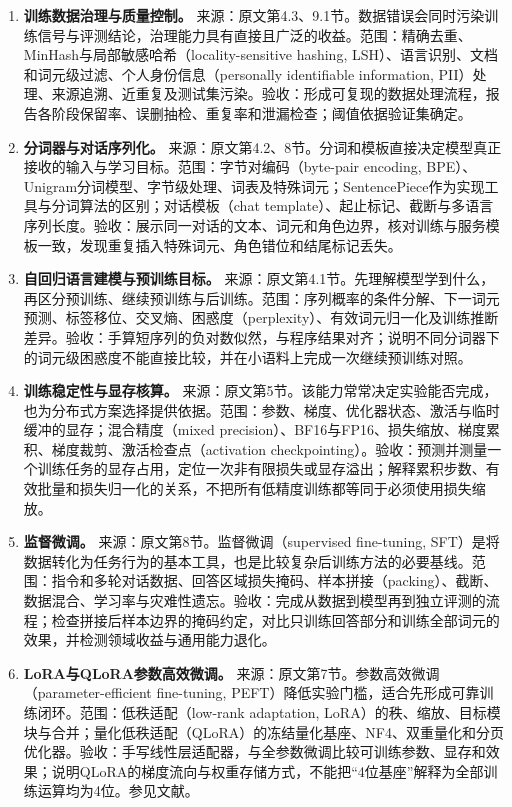 \documentclass[UTF8,12pt,a4paper,fontset=fandol]{ctexart}
\begin{document}
\begin{enumerate}[label=\arabic*.,series=techrank]
\item \textbf{训练数据治理与质量控制。}\label{tech:data}
来源：原文第4.3、9.1节。数据错误会同时污染训练信号与评测结论，治理能力具有直接且广泛的收益。范围：精确去重、MinHash与局部敏感哈希（locality-sensitive hashing, LSH）、语言识别、文档和词元级过滤、个人身份信息（personally identifiable information, PII）处理、来源追溯、近重复及测试集污染。验收：形成可复现的数据处理流程，报告各阶段保留率、误删抽检、重复率和泄漏检查；阈值依据验证集确定。

\item \textbf{分词器与对话序列化。}\label{tech:tokenizer}
来源：原文第4.2、8节。分词和模板直接决定模型真正接收的输入与学习目标。范围：字节对编码（byte-pair encoding, BPE）、Unigram分词模型、字节级处理、词表及特殊词元；SentencePiece作为实现工具与分词算法的区别；对话模板（chat template）、起止标记、截断与多语言序列长度。验收：展示同一对话的文本、词元和角色边界，核对训练与服务模板一致，发现重复插入特殊词元、角色错位和结尾标记丢失。

\item \textbf{自回归语言建模与预训练目标。}\label{tech:pretraining}
来源：原文第4.1节。先理解模型学到什么，再区分预训练、继续预训练与后训练。范围：序列概率的条件分解、下一词元预测、标签移位、交叉熵、困惑度（perplexity）、有效词元归一化及训练推断差异。验收：手算短序列的负对数似然，与程序结果对齐；说明不同分词器下的词元级困惑度不能直接比较，并在小语料上完成一次继续预训练对照。

\item \textbf{训练稳定性与显存核算。}\label{tech:stability}
来源：原文第5节。该能力常常决定实验能否完成，也为分布式方案选择提供依据。范围：参数、梯度、优化器状态、激活与临时缓冲的显存；混合精度（mixed precision）、BF16与FP16、损失缩放、梯度累积、梯度裁剪、激活检查点（activation checkpointing）。验收：预测并测量一个训练任务的显存占用，定位一次非有限损失或显存溢出；解释累积步数、有效批量和损失归一化的关系，不把所有低精度训练都等同于必须使用损失缩放。

\item \textbf{监督微调。}\label{tech:sft}
来源：原文第8节。监督微调（supervised fine-tuning, SFT）是将数据转化为任务行为的基本工具，也是比较复杂后训练方法的必要基线。范围：指令和多轮对话数据、回答区域损失掩码、样本拼接（packing）、截断、数据混合、学习率与灾难性遗忘。验收：完成从数据到模型再到独立评测的流程；检查拼接后样本边界的掩码约定，对比只训练回答部分和训练全部词元的效果，并检测领域收益与通用能力退化。

\item \textbf{LoRA与QLoRA参数高效微调。}\label{tech:peft}
来源：原文第7节。参数高效微调（parameter-efficient fine-tuning, PEFT）降低实验门槛，适合先形成可靠训练闭环。范围：低秩适配（low-rank adaptation, LoRA）的秩、缩放、目标模块与合并；量化低秩适配（QLoRA）的冻结量化基座、NF4、双重量化和分页优化器。验收：手写线性层适配器，与全参数微调比较可训练参数、显存和效果；说明QLoRA的梯度流向与权重存储方式，不能把“4位基座”解释为全部训练运算均为4位。参见文献\cite{qlora}。


\end{enumerate}
\end{document}
